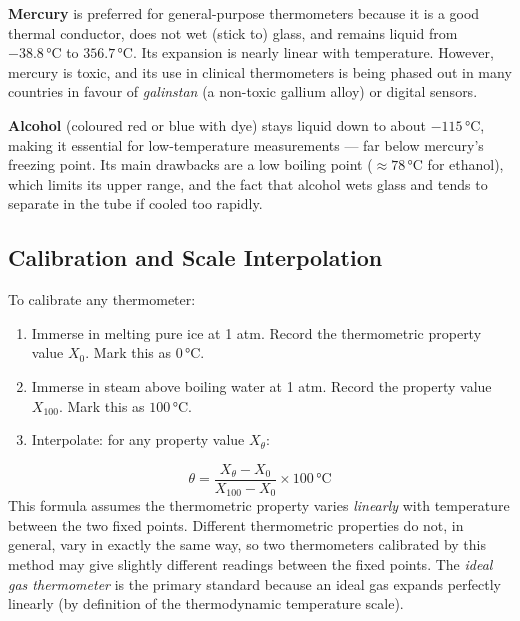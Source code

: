 \begin{notebox}
\textbf{Mercury} is preferred for general-purpose
thermometers because it is a good thermal conductor,
does not wet (stick to) glass, and remains liquid
from $-38.8\,°\text{C}$ to $356.7\,°\text{C}$.
Its expansion is nearly linear with temperature.
However, mercury is toxic, and its use in clinical
thermometers is being phased out in many countries
in favour of \textit{galinstan} (a non-toxic gallium
alloy) or digital sensors.

\textbf{Alcohol} (coloured red or blue with dye)
stays liquid down to about $-115\,°\text{C}$,
making it essential for low-temperature measurements
--- far below mercury's freezing point. Its main
drawbacks are a low boiling point ($\approx 78\,°\text{C}$
for ethanol), which limits its upper range, and the
fact that alcohol wets glass and tends to separate
in the tube if cooled too rapidly.
\end{notebox}

\subsection{Calibration and Scale Interpolation}

\begin{processbox}
To calibrate any thermometer:
\begin{enumerate}[noitemsep]
  \item Immerse in melting pure ice at 1 atm.
  Record the thermometric property value $X_0$.
  Mark this as $0\,°\text{C}$.
  \item Immerse in steam above boiling water at 1 atm.
  Record the property value $X_{100}$.
  Mark this as $100\,°\text{C}$.
  \item Interpolate: for any property value $X_\theta$:
\end{enumerate}
\[
  \theta = \frac{X_\theta - X_0}{X_{100} - X_0}
  \times 100\,°\text{C}
\]
This formula assumes the thermometric property varies
\textit{linearly} with temperature between the two
fixed points. Different thermometric properties do
not, in general, vary in exactly the same way, so
two thermometers calibrated by this method may give
slightly different readings between the fixed points.
The \textit{ideal gas thermometer} is the primary
standard because an ideal gas expands perfectly
linearly (by definition of the thermodynamic
temperature scale).
\end{processbox}

